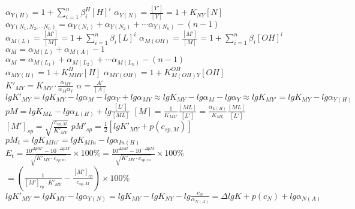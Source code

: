 \documentclass[10pt,twocolumn]{article}
\begin{document}
    \(\alpha_{Y(H)}=1+\sum\limits_{i=1}^n \beta_i^H[H]^i\)
    \(\alpha_{Y(N)}=\frac{[Y']}{[Y]}=1+K_{NY}[N]\) \\
    \(\alpha_{Y(N_1,N_2,\cdots N_n)}=\alpha_{Y(N_1)}+\alpha_{Y(N_2)}+\cdots \alpha_{Y(N_n)}- (n-1)\) \\
    \(\alpha_{M(L)}=\frac{[M']}{[M]}=1+\sum\limits_{i=1}^n \beta_i [L]^i\) \quad
    \(\alpha_{M(OH)}=\frac{[M']}{[M]}=1+\sum\limits_{i=1}^n \beta_i [OH]^i\)\\
    \(\alpha_M = \alpha_{M(L)} + \alpha_{M(A)} - 1\) \\
    \(\alpha_{M}=\alpha_{M(L_1)}+\alpha_{M(L_2)}+\cdots \alpha_{M(L_n)}- (n-1)\) \\
    \(\alpha_{MY(H)} = 1 + K^H_{MHY}[H]\) \quad
    \(\alpha_{MY(OH)} = 1 + K^{OH}_{M(OH)Y}[OH]\) \\
    \(K'_{MY}=K_{MY}\cdot \frac{\alpha_{MY}}{\alpha_M \alpha_Y}\) \quad
    \(\alpha = \frac{{A'}}{[A]}\) \\
    \(lgK'_{MY}=lgK_{MY}-lg \alpha_M - lg \alpha_Y+lg \alpha_{MY} \approx lgK_{MY}-lg \alpha_M - lg \alpha_Y \approx lgK_{MY'} = lgK_{MY} - lg\alpha_{Y(H)}\) \\
    \(pM=lgK_{ML}-lg\alpha_{L(H)}+lg\frac{[L']}{[ML]}\) \quad
    \([M] = \frac{1}{K_{ML'}}\frac{[ML]}{[L']} = \frac{\alpha_{L(H)}}{K_{ML}}\frac{[ML]}{[L']}\) \\
    \([M']_{sp}=\sqrt{\frac{c_{sp,M}}{K'_{MY}}}\) \quad
    \(pM'_{sp} = \frac{1}{2}[lgK'_{MY}+p(c_{sp,M})]\) \\
    \(pM_t = lg K_{MIn'} = lgK_{MIn} - lg \alpha_{In(H)}\) \\
    \(E_t = \frac{10^{\Delta pM'}-10^{-\Delta pM'}}{\sqrt{K'_{MY}\cdot c_{sp,m}}} \times 100\% = \frac{10^{\Delta pM}-10^{-\Delta pM}}{\sqrt{K'_{MY}\cdot c_{sp,m}}} \times 100\% \)\\
    \(= (\frac{1}{[M']_{ep}\cdot K'_{MY}}-\frac{[M']_{ep}}{c_{sp,M}}) \times 100 \%\) \\
    \(lgK'_{MY} = lgK_{MY} - lg \alpha_{Y(N)} = lgK_{MY} - lgK_{NY} - lg\frac{c_N}{\alpha_{N(A)}} = \Delta lgK + p(c_N) + lg \alpha_{N(A)}\)
\end{document}
